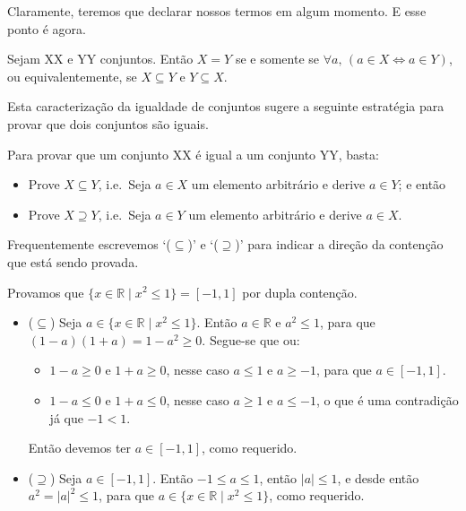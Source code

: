 Claramente, teremos que declarar nossos termos em algum momento. E esse ponto é agora.

\begin{axiom}
\label{axSetEquality}
Sejam XX e YY conjuntos. Então $X=Y$ se e somente se $\forall a,\, (a \in X \Leftrightarrow a \in Y)$, ou equivalentemente, se $X \subseteq Y$ e $Y \subseteq X$.
\end{axiom}

Esta caracterização da igualdade de conjuntos sugere a seguinte estratégia para provar que dois conjuntos são iguais.

\begin{strategy}
Para provar que um conjunto XX é igual a um conjunto YY, basta:
\begin{itemize}
\item Prove $X \subseteq Y$, i.e.\ Seja $a \in X$ um elemento arbitrário e derive $a \in Y$; e então
\item Prove $X \supseteq Y$, i.e.\ Seja $a \in Y$ um elemento arbitrário e derive $a \in X$.
\end{itemize}
Frequentemente escrevemos `($\subseteq$)' e `($\supseteq$)' para indicar a direção da contenção que está sendo provada.
\end{strategy}

\begin{example}
\label{exPositiveNegativeSetBuilderNotation}
Provamos que $\{ x \in \mathbb{R} \mid x^2 \le 1 \} = [-1,1]$ por dupla contenção.
\begin{itemize}
\item ($\subseteq$) Seja $a \in \{ x \in \mathbb{R} \mid x^2 \le 1 \}$. Então $a \in \mathbb{R}$ e $a^2 \le 1$, para que $(1-a)(1+a) = 1-a^2 \ge 0$. Segue-se que ou:
\begin{itemize}
\item $1-a \ge 0$ e $1+a \ge 0$, nesse caso $a \le 1$ e $a \ge -1$, para que $a \in [-1,1]$.
\item $1-a \le 0$ e $1+a \le 0$, nesse caso $a \ge 1$ e $a \le -1$, o que é uma contradição já que $-1 < 1$.
\end{itemize}
Então devemos ter $a \in [-1,1]$, como requerido.

\item ($\supseteq$) Seja $a \in [-1,1]$. Então $-1 \le a \le 1$, então $|a| \le 1$, e desde então $a^2 = |a|^2 \le 1$, para que $a \in \{ x \in \mathbb{R} \mid x^2 \le 1 \}$, como requerido.
\end{itemize}
\end{example}


